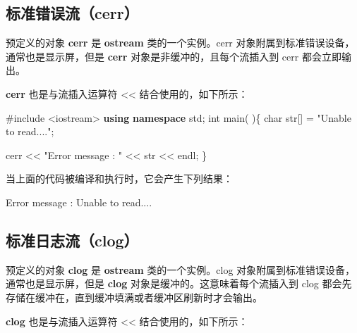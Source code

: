 \documentclass[
]{article}
\newenvironment{Shaded}{}{}
\newcommand{\DataTypeTok}[1]{\textcolor[rgb]{0.56,0.13,0.00}{#1}}
\newcommand{\ImportTok}[1]{#1}
\newcommand{\KeywordTok}[1]{\textcolor[rgb]{0.00,0.44,0.13}{\textbf{#1}}}
\newcommand{\NormalTok}[1]{#1}
\newcommand{\OperatorTok}[1]{\textcolor[rgb]{0.40,0.40,0.40}{#1}}
\newcommand{\PreprocessorTok}[1]{\textcolor[rgb]{0.74,0.48,0.00}{#1}}
\newcommand{\StringTok}[1]{\textcolor[rgb]{0.25,0.44,0.63}{#1}}
\begin{document}
\hypertarget{ux6807ux51c6ux9519ux8befux6d41cerr}{%
\subsection{标准错误流（cerr）}\label{ux6807ux51c6ux9519ux8befux6d41cerr}}

预定义的对象 \textbf{cerr} 是 \textbf{ostream} 类的一个实例。cerr
对象附属到标准错误设备，通常也是显示屏，但是 \textbf{cerr}
对象是非缓冲的，且每个流插入到 cerr 都会立即输出。

\textbf{cerr} 也是与流插入运算符 \textless\textless{}
结合使用的，如下所示：

\begin{Shaded}
\begin{Highlighting}[]
\PreprocessorTok{\#include }\ImportTok{\textless{}iostream\textgreater{}}
\KeywordTok{using} \KeywordTok{namespace}\NormalTok{ std}\OperatorTok{;}
\DataTypeTok{int}\NormalTok{ main}\OperatorTok{(} \OperatorTok{)\{}
   \DataTypeTok{char}\NormalTok{ str}\OperatorTok{[]} \OperatorTok{=} \StringTok{"Unable to read...."}\OperatorTok{;}
 
\NormalTok{   cerr }\OperatorTok{\textless{}\textless{}} \StringTok{"Error message : "} \OperatorTok{\textless{}\textless{}}\NormalTok{ str }\OperatorTok{\textless{}\textless{}}\NormalTok{ endl}\OperatorTok{;}
\OperatorTok{\}}
\end{Highlighting}
\end{Shaded}

当上面的代码被编译和执行时，它会产生下列结果：

\begin{Shaded}
\begin{Highlighting}[]
\NormalTok{Error message }\OperatorTok{:}\NormalTok{ Unable to read}\OperatorTok{....}
\end{Highlighting}
\end{Shaded}

\hypertarget{ux6807ux51c6ux65e5ux5fd7ux6d41clog}{%
\subsection{标准日志流（clog）}\label{ux6807ux51c6ux65e5ux5fd7ux6d41clog}}

预定义的对象 \textbf{clog} 是 \textbf{ostream} 类的一个实例。clog
对象附属到标准错误设备，通常也是显示屏，但是 \textbf{clog}
对象是缓冲的。这意味着每个流插入到 clog
都会先存储在缓冲在，直到缓冲填满或者缓冲区刷新时才会输出。

\textbf{clog} 也是与流插入运算符 \textless\textless{}
结合使用的，如下所示：
\end{document}
